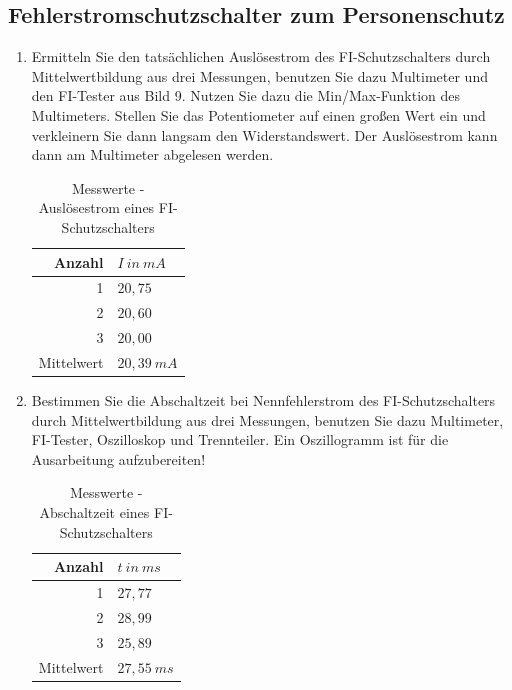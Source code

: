 	\subsection{Fehlerstromschutzschalter zum Personenschutz}
		\begin{enumerate}[label=\alph*)]
			\item Ermitteln Sie den tatsächlichen Auslösestrom des FI-Schutzschalters durch Mittelwertbildung aus drei Messungen, benutzen Sie dazu Multimeter und den FI-Tester aus Bild 9. Nutzen Sie dazu die Min/Max-Funktion des Multimeters. Stellen Sie das Potentiometer auf einen großen Wert ein und verkleinern Sie dann langsam den Widerstandswert. Der Auslösestrom kann dann am Multimeter abgelesen werden.
      \begin{table}[h!]
			  \begin{center}
          \caption{Messwerte - Auslösestrom eines FI-Schutzschalters}
					\begin{tabular}{r l}
						\hline
						Anzahl & \( I\ in\ mA \) \\
						\hline
						1 & \( 20,75 \) \\
						2 & \( 20,60 \) \\
						3 & \( 20,00 \) \\
						\hline
						Mittelwert & \( 20,39\ mA \) \\
						\hline
					\end{tabular}
			\end{center}
    \end{table}
			
			
    \pagebreak
			\item Bestimmen Sie die Abschaltzeit bei Nennfehlerstrom des FI-Schutzschalters durch Mittelwertbildung aus drei Messungen, benutzen Sie dazu Multimeter, FI-Tester, Oszilloskop und Trennteiler. Ein Oszillogramm ist für die Ausarbeitung aufzubereiten! \\
      \begin{table}[h!]
        \begin{center}
          \caption{Messwerte - Abschaltzeit eines FI-Schutzschalters}
					\begin{tabular}{r l}
						\hline
						Anzahl & \( t\ in\ ms \) \\
						\hline
						1 & \( 27,77 \) \\
						2 & \( 28,99 \) \\
						3 & \( 25,89 \) \\
						\hline
						Mittelwert & \( 27,55\ ms \) \\
						\hline
					\end{tabular}
			\end{center}
    \end{table}
			
		\end{enumerate}
 	
